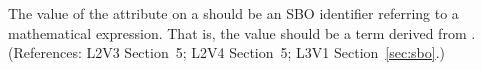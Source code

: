 The value of the  attribute on a \Delay should be an SBO
identifier referring to a mathematical expression.  That is, the value
should be a term derived from \sbomathformula.  (References: 
L2V3 Section~5; L2V4 Section~5; L3V1 Section~\ref{sec:sbo}.)
